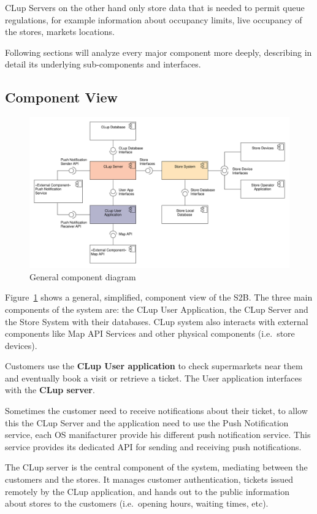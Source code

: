 CLup Servers on the other hand only store data that is needed to permit queue regulations, for example information about occupancy limits, live occupancy of the stores, markets locations.

Following sections will analyze every major component more deeply, describing in detail its underlying sub-components and interfaces.

\subsection{Component View}\label{sect:component_view}
\begin{figure}[H]
    \includegraphics[width=\textwidth]{Images/UML_general_component.pdf}
    \caption{\label{fig:UML_comp_general}General component diagram}
\end{figure}
Figure~\ref{fig:UML_comp_general} shows a general, simplified, component view of the S2B.
The three main components of the system are: the CLup User Application, the CLup Server and the Store System with their databases. CLup system also interacts with external components like Map API Services and other physical components (i.e.~store devices).

Customers use the \textbf{CLup User application} to check supermarkets near them and eventually book a visit or retrieve a ticket. The User application interfaces with the \textbf{CLup server}.

Sometimes the customer need to receive notifications about their ticket, to allow this the CLup Server and the application need to use the Push Notification service, each OS manifacturer provide his different push notification service. This service provides its dedicated API for sending and receiving push notifications.

The CLup server is the central component of the system, mediating between the customers and the stores. It manages customer authentication, tickets issued remotely by the CLup application, and hands out to the public information about stores to the customers (i.e.~opening hours, waiting times, etc).

